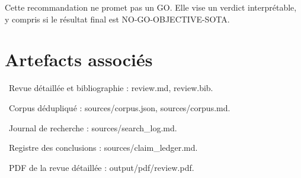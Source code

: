 \documentclass[10pt,a4paper]{article}
\begin{document}
Cette recommandation ne promet pas un GO. Elle vise un verdict interpr\'{e}table,
y compris si le r\'{e}sultat final est NO-GO-OBJECTIVE-SOTA.

\section{Artefacts associ\'{e}s}

\par\noindent\textbullet\ Revue d\'{e}taill\'{e}e et bibliographie : review.md, review.bib.
\par\noindent\textbullet\ Corpus d\'{e}dupliqu\'{e} : sources/corpus.json, sources/corpus.md.
\par\noindent\textbullet\ Journal de recherche : sources/search\_log.md.
\par\noindent\textbullet\ Registre des conclusions : sources/claim\_ledger.md.
\par\noindent\textbullet\ PDF de la revue d\'{e}taill\'{e}e : output/pdf/review.pdf.
\end{document}
